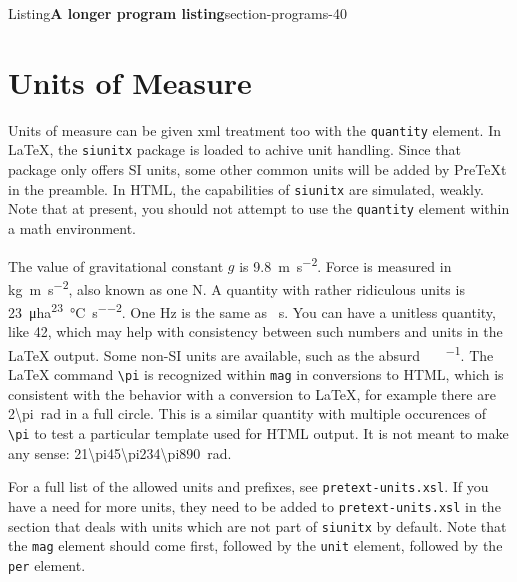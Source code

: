\documentclass{amsart}
\theoremstyle{plain}%
\theoremstyle{definition}%
\theoremstyle{remark}%
\newcommand{\mono}[1]{\texttt{#1}}
\numberwithin{equation}{section}
\begin{document}
\begin{listingptx}{Listing}{\textbf{A longer program listing}}{section-programs-40}{}
\end{listingptx}%
%
%
\typeout{************************************************}
\typeout{************************************************}
%
\section{Units of Measure}\label{section-units-measure}%
Units of measure can be given xml treatment too with the \mono{quantity} element. In \LaTeX{}, the \mono{siunitx} package is loaded to achive unit handling. Since that package only offers SI units, some other common units will be added by PreTeXt in the preamble. In HTML, the capabilities of \mono{siunitx} are simulated, weakly. Note that at present, you should not attempt to use the \mono{quantity} element within a math environment.%
\par
The value of gravitational constant \(g\) is \SI{9.8}{\meter\per\second\tothe{2}}. Force is measured in \si{\kilo\gram\meter\per\second\tothe{2}}, also known as one \si{\newton}. A quantity with rather ridiculous units is \SI{23}{\micro\hectare\tothe{23}\per\degreeCelsius\per\second\tothe{2}}. One \si{\hertz} is the same as \si{\per\second}. You can have a unitless quantity, like \num{42}, which may help with consistency between such numbers and units in the \LaTeX{} output. Some non-SI units are available, such as the absurd \si{\degreeFahrenheit\foot\pound\per\gallon}.  The \LaTeX{} command \mono{\textbackslash{}pi} is recognized within \mono{mag} in conversions to HTML, which is consistent with the behavior with a conversion to \LaTeX{}, for example there are \SI{2\pi}{\radian} in a full circle.  This is a similar quantity with multiple occurences of \mono{\textbackslash{}pi} to test a particular template used for HTML output.  It is not meant to make any sense: \SI{21\pi45\pi234\pi890}{\radian}.%
\par
For a full list of the allowed units and prefixes, see \mono{pretext-units.xsl}. If you have a need for more units, they need to be added to \mono{pretext-units.xsl} in the section that deals with units which are not part of \mono{siunitx} by default.  Note that the \mono{mag} element should come first, followed by the \mono{unit} element, followed by the \mono{per} element.%
%
%
\typeout{************************************************}
\typeout{************************************************}
%
\end{document}
